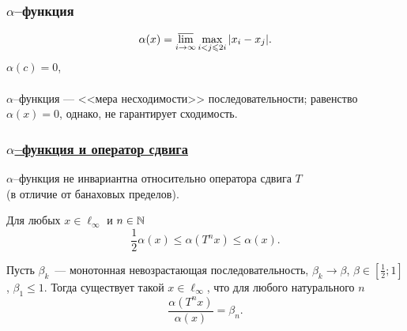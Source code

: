 \begin{frame}\frametitle{$\alpha$--функция}
	\begin{equation}
		\alpha(x) = \varlimsup_{i\to\infty} \max_{i<j\leqslant 2i} |x_i - x_j|
		.
	\end{equation}
	$\alpha(c)=0$,
	\\~\\
	$\alpha$--функция --- <<мера несходимости>> последовательности;
	равенство $\alpha(x) = 0$, однако, не гарантирует сходимость.

\end{frame}

\begin{frame}\frametitle{\underline{$\alpha$--функция и оператор сдвига}}

	$\alpha$--функция не инвариантна относительно оператора сдвига $T$
	\\
	(в отличие от банаховых пределов).

	\begin{ttheorem}
		Для любых $x\in\ell_\infty$ и $n \in \mathbb{N}$
		\begin{equation}\label{est_alpha_Tn_x}
			\frac{1}{2}\alpha(x) \leq \alpha(T^n x) \leq \alpha(x)
			.
		\end{equation}
	\end{ttheorem}

	\begin{ttheorem}
		Пусть $\beta_k$~--- монотонная невозрастающая последовательность,
		$\beta_k \to \beta$, $\beta\in\left[\frac{1}{2}; 1\right]$, $\beta_1 \leq 1$.
		Тогда существует такой $x\in\ell_\infty$, что для любого натурального $n$
		\begin{equation}
			\frac{\alpha(T^n x)}{\alpha(x)} = \beta_n.
		\end{equation}
	\end{ttheorem}
\end{frame}


